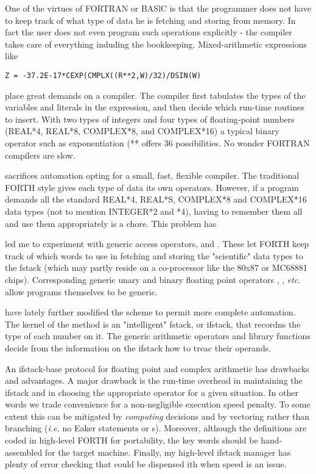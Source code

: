 One of the virtues of FORTRAN or BASlC is that the programmer does not have to keep track of what type of data he is fetching and storing from memory. In fact the user does not even program such operations explicitly - the compiler takes care of everything induding the bookkeeping. Mixed-arithmetic expressions like

\begin{lstlisting}
Z = -37.2E-17*CEXP(CMPLX((R**2,W)/32)/DSIN(W)
\end{lstlisting}

place great demands on a compiler. The compiler first tabulates the types of the variables and literals in the expression, and then decide which run-time routines to insert. With two types of integers and four types of floating-point numbers (REAL*4, REAL*8, COMPLEX*8, and COMPLEX*16) a typical binary operator such as exponentiation (** offers 36 possibilities. No wonder FORTRAN compilers are slow. 

 sacrifices automation opting for a small, fast, flexible compiler. The traditional FORTH style gives each type of data its own operators. However, if a program demands all the standard REAL*4, REAL*S, COMPLEX*8 and COMPLEX*16 data types (not to mention INTEGER*2 and *4), having to remember them all and use them appropriately is a chore. This problem has

led me to experiment with generic access operators,  and . These let FORTH keep track of which words to use in fetching and storing the "scientific" data types to the fstack (which may partly reside on a co-processor like the 80x87 or MC68881 chips). Corresponding generic unary and binary floating point operators , , \textit{etc}. allow programs themselves to be generic.

 have lately further modified the scheme to permit more complete automation. The kernel of the method is an "intelligent" fstack, or ifstack, that recordns the type of each number on it. The generic arithmetic operators and library functions decide from the information on the ifstack how to treac their operands.

An ifstack-base protocol for floating point and complex arithmetic has drawbacks and advantages. A major drawback is the run-time overhead in maintaining the ifstack and in choosing the appropriate operator for a given situation. In other words we trade convenience for a non-negligible execution speed penalty. To some extent this can be mitigated by \textit{computing} decisions and by vectoring rather than branching (\textit{i.e.} no Eaker  statements or s). Moreover, although the definitions are coded in high-level FORTH for portability, the key words should be hand-assembled for the target machine. Finally, my high-level ifstack manager has plenty of error checking that could be dispensed ith when speed is an issue.

